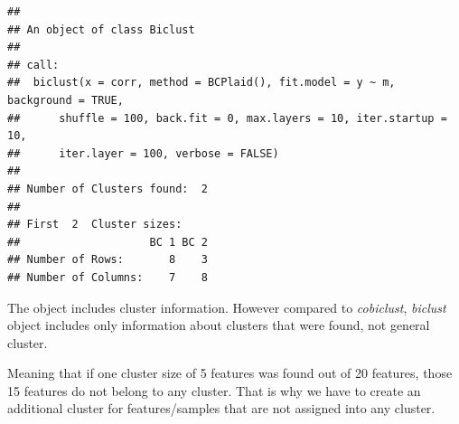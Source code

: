 \documentclass[
]{book}
\begin{document}
\begin{verbatim}
## 
## An object of class Biclust 
## 
## call:
##  biclust(x = corr, method = BCPlaid(), fit.model = y ~ m, background = TRUE, 
##      shuffle = 100, back.fit = 0, max.layers = 10, iter.startup = 10, 
##      iter.layer = 100, verbose = FALSE)
## 
## Number of Clusters found:  2 
## 
## First  2  Cluster sizes:
##                    BC 1 BC 2
## Number of Rows:       8    3
## Number of Columns:    7    8
\end{verbatim}

The object includes cluster information. However compared to \emph{cobiclust},
\emph{biclust} object includes only information about clusters that were found, not general cluster.

Meaning that if one cluster size of 5 features was found out of 20 features,
those 15 features do not belong to any cluster. That is why we have to create an
additional cluster for features/samples that are not assigned into any cluster.
\end{document}
